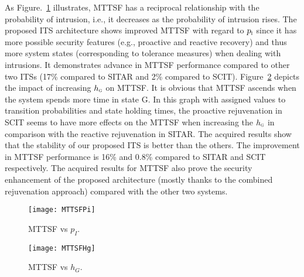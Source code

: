 \documentclass[preprint,number,12pt]{elsarticle}
\begin{document}
As Figure.~\ref{fig:MTTSFpI} illustrates, MTTSF has a reciprocal relationship with the probability of intrusion, i.e., it decreases as the probability of intrusion rises. The proposed ITS architecture shows improved MTTSF with regard to $p_{\scalebox{0.5}{I}}$ since it has more possible security features (e.g., proactive and reactive recovery) and thus more system states (corresponding to tolerance measures) when dealing with intrusions. It demonstrates advance in MTTSF performance compared to other two ITSs (17\% compared to SITAR and 2\% compared to SCIT). Figure~\ref{fig:MTTSFhG} depicts the impact of increasing $h_{\scalebox{0.5}{G}}$ on MTTSF. It is obvious that MTTSF ascends when the system spends more time in state G. In this graph with assigned values to transition probabilities and state holding times, the proactive rejuvenation in SCIT seems to have more effects on the MTTSF when increasing the $h_{\scalebox{0.5}{G}}$ in comparison with the reactive rejuvenation in SITAR. The acquired results show that the stability of our proposed ITS is better than the others. The improvement in MTTSF performance is 16\% and 0.8\% compared to SITAR and SCIT respectively. The acquired results for MTTSF also prove the security enhancement of the proposed architecture (mostly thanks to the combined rejuvenation approach) compared with the other two systems.
\begin{figure}[!t]
\centering
\texttt{[image: MTTSFPi]}
\caption{MTTSF vs $p_{I}$.}
\label{fig:MTTSFpI}
\end{figure}
\begin{figure}[!t]
\centering
\texttt{[image: MTTSFHg]}
\caption{MTTSF vs $h_{G}$.}
\label{fig:MTTSFhG}
\end{figure}
\end{document}
